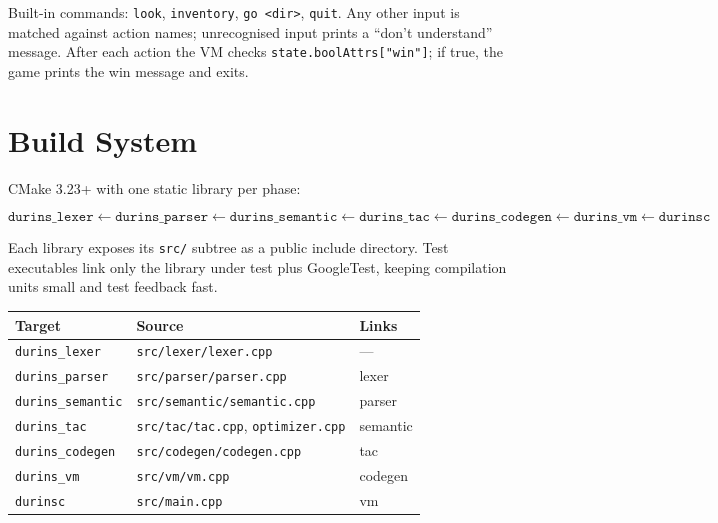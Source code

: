 \documentclass[12pt, a4paper]{article}
\begin{document}
Built-in commands: \texttt{look}, \texttt{inventory}, \texttt{go \textless dir\textgreater},
\texttt{quit}.
Any other input is matched against action names; unrecognised input prints a
``don't understand'' message.
After each action the VM checks \texttt{state.boolAttrs["win"]}; if true, the
game prints the win message and exits.

\section{Build System}

CMake 3.23+ with one static library per phase:

\[
\texttt{durins\_lexer} \leftarrow \texttt{durins\_parser} \leftarrow
\texttt{durins\_semantic} \leftarrow \texttt{durins\_tac} \leftarrow
\texttt{durins\_codegen} \leftarrow \texttt{durins\_vm} \leftarrow \texttt{durinsc}
\]

Each library exposes its \texttt{src/} subtree as a public include directory.
Test executables link only the library under test plus GoogleTest, keeping
compilation units small and test feedback fast.

\begin{center}
\begin{tabular}{lll}
\toprule
\textbf{Target} & \textbf{Source} & \textbf{Links} \\
\midrule
\texttt{durins\_lexer}   & \texttt{src/lexer/lexer.cpp}            & --- \\
\texttt{durins\_parser}  & \texttt{src/parser/parser.cpp}          & lexer \\
\texttt{durins\_semantic}& \texttt{src/semantic/semantic.cpp}      & parser \\
\texttt{durins\_tac}     & \texttt{src/tac/tac.cpp}, \texttt{optimizer.cpp} & semantic \\
\texttt{durins\_codegen} & \texttt{src/codegen/codegen.cpp}        & tac \\
\texttt{durins\_vm}      & \texttt{src/vm/vm.cpp}                  & codegen \\
\texttt{durinsc}         & \texttt{src/main.cpp}                   & vm \\
\bottomrule
\end{tabular}
\end{center}

\end{document}

